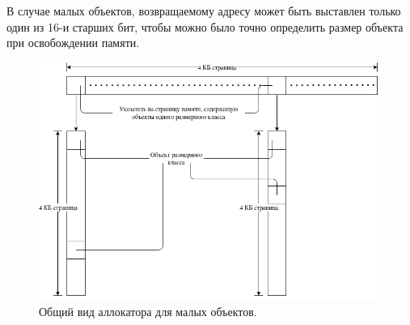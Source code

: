В случае малых объектов, возвращаемому адресу может быть выставлен только один из 16-и старших бит, чтобы можно было точно определить размер объекта при освобождении памяти.

\begin{figure}[!h]
	\begin{center}
		\includegraphics[scale=0.6]{images/small-allocator-design.png}
		\caption{Общий вид аллокатора для малых объектов.}
		\label{small-allocator-design}
	\end{center}
\end{figure}

